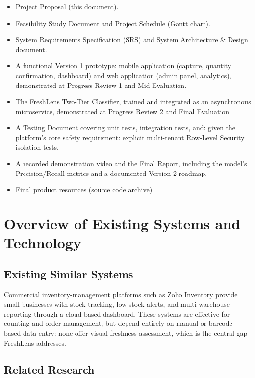 \documentclass[12pt,a4paper]{article}
\begin{document}
\begin{itemize}[leftmargin=1.2cm]
    \item Project Proposal (this document).
    \item Feasibility Study Document and Project Schedule (Gantt chart).
    \item System Requirements Specification (SRS) and System Architecture \& Design document.
    \item A functional Version 1 prototype: mobile application (capture, quantity confirmation, dashboard) and web application (admin panel, analytics), demonstrated at Progress Review 1 and Mid Evaluation.
    \item The FreshLens Two-Tier Classifier, trained and integrated as an asynchronous microservice, demonstrated at Progress Review 2 and Final Evaluation.
    \item A Testing Document covering unit tests, integration tests, and: given the platform's core safety requirement: explicit multi-tenant Row-Level Security isolation tests.
    \item A recorded demonstration video and the Final Report, including the model's Precision/Recall metrics and a documented Version 2 roadmap.
    \item Final product resources (source code archive).
\end{itemize}

\section{Overview of Existing Systems and Technology}
\label{sec:architecture}

\subsection{Existing Similar Systems}

Commercial inventory-management platforms such as Zoho Inventory \cite{zoho} provide small businesses with stock tracking, low-stock alerts, and multi-warehouse reporting through a cloud-based dashboard. These systems are effective for counting and order management, but depend entirely on manual or barcode-based data entry: none offer visual freshness assessment, which is the central gap FreshLens addresses.

\subsection{Related Research}
\end{document}
